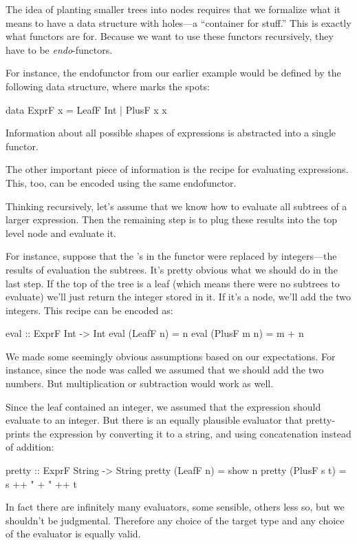 \documentclass[DaoFP]{subfiles}
\begin{document}
The idea of planting smaller trees into nodes requires that we formalize what it means to have a data structure with holes---a ``container for stuff.'' This is exactly what functors are for. Because we want to use these functors recursively, they have to be \emph{endo}-functors.

For instance, the endofunctor from our earlier example would be defined by the following data structure, where  marks the spots:
\begin{haskell}
data ExprF x = LeafF Int | PlusF x x
\end{haskell}
Information about all possible shapes of expressions is abstracted into a single functor. 

The other important piece of information is the recipe for evaluating expressions. This, too, can be encoded using the same endofunctor. 

Thinking recursively, let's assume that we know how to evaluate all subtrees of a larger expression. Then the remaining step is to plug these results into the top level node and evaluate it. 

For instance, suppose that the 's in the functor were replaced by integers---the results of evaluation the subtrees. It's pretty obvious what we should do in the last step. If the top of the tree is a leaf (which means there were no subtrees to evaluate) we'll just return the integer stored in it. If it's a  node, we'll add the two integers. This recipe can be encoded as:
\begin{haskell}
eval :: ExprF Int -> Int
eval (LeafF n)   = n
eval (PlusF m n) = m + n
\end{haskell}

We made some seemingly obvious assumptions based on our expectations. For instance, since the node was called  we assumed that we should add the two numbers. But multiplication or subtraction would work as well.

Since the leaf contained an integer, we assumed that the expression should evaluate to an integer. But there is an equally plausible evaluator that pretty-prints the expression by converting it to a string, and using concatenation instead of addition:
\begin{haskell}
pretty :: ExprF String -> String
pretty (LeafF n)   = show n
pretty (PlusF s t) = s ++ " + " ++ t
\end{haskell}

In fact there are infinitely many evaluators, some sensible, others less so, but we shouldn't be judgmental. Therefore any choice of the target type and any choice of the evaluator is equally valid. 
\end{document}
